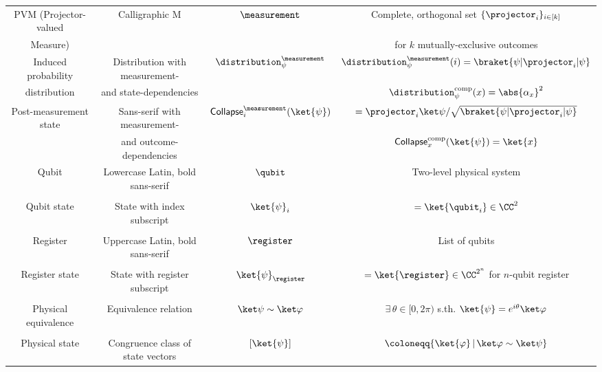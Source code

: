 \begin{table}
{\begin{tabular}{cccc}
        PVM (Projector-valued & Calligraphic M & $\measurement$ & Complete, orthogonal set $\{ \projector_i \}_{i \in [k]}$ \\
        Measure) &&& for $k$ mutually-exclusive outcomes \\
        Induced probability & Distribution with measurement- & $\distribution_\psi^{\measurement}$ &
          $\distribution_\psi^{\measurement}(i) = \braket{\psi|\projector_i|\psi}$ \\
        distribution & and state-dependencies && $\distribution_\psi^{\mathrm{comp}}(x) = \abs{\alpha_x}^2$ \\
        Post-measurement state & Sans-serif with measurement- &
        $\mathsf{Collapse}_i^{\measurement}(\ket{\psi})$ & $= \projector_i \ket\psi / \sqrt{\braket{\psi|\projector_i|\psi}} $ \\
        & and outcome-dependencies && $\mathsf{Collapse}_x^{\mathrm{comp}}(\ket{\psi}) = \ket{x}$ \\ 
        \midrule
        Qubit & Lowercase Latin, bold sans-serif & $\qubit$ & Two-level physical system \\
        &&& \\
        Qubit state & State with index subscript & $\ket{\psi}_i$ & $= \ket{\qubit_i} \in \CC^2$ \\
        &&& \\
        Register & Uppercase Latin, bold sans-serif & $\register$ & List of qubits \\
        &&& \\
        Register state & State with register subscript &
          $\ket{\psi}_{\register}$ & $= \ket{\register} \in \CC^{2^n}$ for $n$-qubit register \\
        &&& \\
        \midrule
        Physical equivalence & Equivalence relation & $\ket\psi \sim
          \ket\varphi$ & $\exists\, {\theta\in[0,2\pi)}$ s.th. $\ket{\psi} = e^{i\theta}\ket\varphi$ \\
        &&& \\
        Physical state & Congruence class of state vectors & $[\ket{\psi}]$ & 
          $\coloneqq \{ \ket{\varphi}\, |\, \ket\varphi \sim \ket\psi \}$ \\

\end{tabular}}
\end{table}

